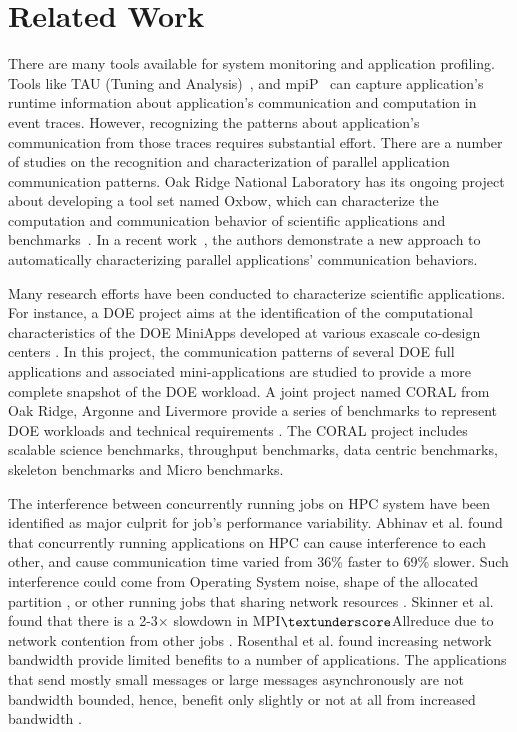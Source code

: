 \section{Related Work}
\label{sec:related_work}

There are many tools available for system monitoring and application profiling. Tools like TAU (Tuning and Analysis)~\cite{tau}, 
and mpiP~\cite{mpip} can capture application's runtime information about application's communication and computation in event traces. However, recognizing the patterns about application's communication from those traces requires substantial effort. There are a number of studies on the recognition and characterization of parallel application communication patterns. Oak Ridge National Laboratory has its ongoing project about developing a tool set named Oxbow, which can characterize the computation and communication behavior of scientific applications and benchmarks~\cite{oxbow}. In a recent work~\cite{roth}, the authors demonstrate a new approach to automatically characterizing parallel applications' communication behaviors. 


Many research efforts have been conducted to characterize scientific applications. For instance, a DOE project aims at the identification of the computational characteristics of the DOE MiniApps developed at various exascale co-design centers \cite{designforwardwebpage}. In this project, the communication patterns of several DOE full applications and associated mini-applications are studied to provide a more complete snapshot of the DOE workload. A joint project named CORAL from Oak Ridge, Argonne and Livermore provide a series of benchmarks to represent DOE workloads and technical requirements \cite{coral}. The CORAL project includes scalable science benchmarks, throughput benchmarks, data centric benchmarks, skeleton benchmarks and Micro benchmarks.  

The interference between concurrently running jobs on HPC system have been identified as major culprit for job's performance variability. Abhinav et al. found that concurrently running applications on HPC can cause interference to each other, and cause communication time varied from 36\% faster to 69\% slower. Such interference could come from Operating System noise, shape of the allocated partition , or other running jobs that sharing network resources \cite{abhinav-sc13}. Skinner et al. found that  there is a 2-3$\times$ slowdown in MPI$\textunderscore$Allreduce due to network contention from other jobs \cite{skinner}. Rosenthal et al. found increasing network bandwidth provide limited benefits to a number of applications. The applications that send mostly small messages or large messages asynchronously are not bandwidth bounded, hence, benefit only slightly or not at all from increased bandwidth \cite{rosenthal}.

